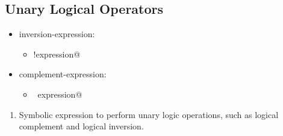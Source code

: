 \subsection{Unary Logical Operators}
\begin{itemize}[before=\itshape, label={}]
	\item inversion-expression:
	\begin{itemize}[before=\itshape, label={}]
		\item \lstinline@!expression@
	\end{itemize}
	\item complement-expression:
	\begin{itemize}[before=\itshape, label={}]
		\item \lstinline@~expression@
	\end{itemize}
\end{itemize}
\begin{enumerate}
	\item Symbolic expression to perform unary logic operations, such as logical complement and logical inversion.
\end{enumerate}
